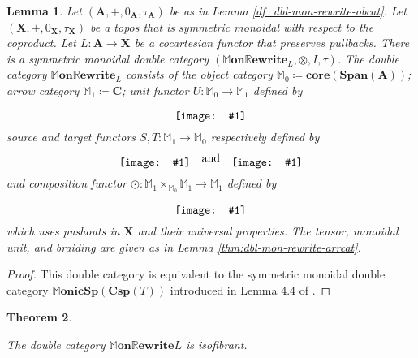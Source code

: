 \documentclass{amsart}
\newcommand{\MM}{\mathbb{M}}
\newcommand{\A}{\cat{A}}
\newcommand{\C}{\cat{C}}
\newcommand{\X}{\cat{X}}
\newcommand{\core}{\mathbf{core}}
\newcommand{\cat}[1]{\mathbf{#1}}
\newcommand{\from}{\colon}
\newcommand{\diagram}[1]{\raisebox{-0.5\height}{\texttt{[image: \#1]}}}
\newcommand{\Span}{\mathbf{Span}}
\newcommand{\MMonSpCsp}[1]{\mathbb{M}\mathbf{onicSp}(\mathbf{Csp}(#1))}
\newcommand{\MMonRewrite}{ \mathbb{M}\mathbf{on}\mathbb{R}\mathbf{ewrite} }
\newtheorem{theorem}{Theorem}[section]
\newtheorem{lemma}[theorem]{Lemma}
\theoremstyle{remark}
\theoremstyle{definition}
\begin{document}

\begin{lemma} \label{thm:dbl-mon-rewr-smc} 
  Let $ (\A , + , 0_\A , \tau_\A ) $ be as in Lemma
  \ref{df_dbl-mon-rewrite-obcat}. Let $ (\X , + , 0_\X , \tau_\X ) $
  be a topos that is symmetric monoidal with respect to the
  coproduct. Let $ L \from \A \to \X $ be a cocartesian functor that
  preserves pullbacks.  There is a symmetric monoidal double category
  $ (\MMonRewrite_{L} , \otimes , I , \tau) $. The double category
  $ \MMonRewrite_{L} $ consists of the object category
  $ \MM_0 \coloneqq \core (\Span (\A)) $; arrow category
  $ \MM_1 \coloneqq \C $; unit functor $ U \from \MM_0 \to \MM_1 $
  defined by
  \[
    \diagram{diag_lr_dbl-mon-rewrite-unit-functor}
  \]
  source and target functors $ S , T \from \MM_1 \to \MM_0 $
  respectively defined by
  \[
    \diagram{diag_lr_dbl-mon-rewrite-source-functor} \quad
    \text{and} \quad
    \diagram{diag_lr_dbl-mon-rewrite-target-functor}
  \]
  and composition functor
  $ \odot \from \MM_1 \times_{\MM_0} \MM_1 \to \MM_1 $ defined
  by
  \[
    \diagram{diag_lr_dbl-mon-rewrite-composition-functor}
  \]
  which uses pushouts in $ \X $ and their universal properties.
  The tensor, monoidal unit, and braiding are given as in Lemma
  \ref{thm:dbl-mon-rewrite-arrcat}.
\end{lemma}

\begin{proof}

  This double category is equivalent to the symmetric monoidal double
  category $\MMonSpCsp{T}$ introduced in Lemma 4.4 of
  \cite{sp-csp-top}.
  
\end{proof}

\begin{theorem} \label{thm:dbl-mon-rewrite_isofibrant}
	
  The double category $ \MMonRewrite{L} $ is isofibrant.
  
\end{theorem}
\end{document}
